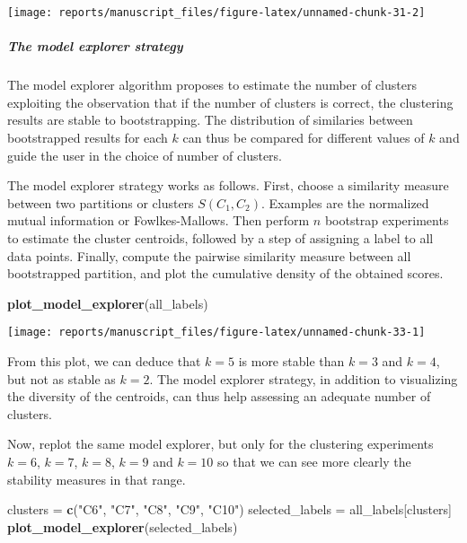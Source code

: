 \documentclass[9pt,a4paper,]{extarticle}
\newenvironment{Shaded}{\begin{snugshade}}{\end{snugshade}}
\newcommand{\KeywordTok}[1]{\textcolor[rgb]{0.13,0.29,0.53}{\textbf{#1}}}
\newcommand{\NormalTok}[1]{#1}
\newcommand{\StringTok}[1]{\textcolor[rgb]{0.31,0.60,0.02}{#1}}
\begin{document}
\begin{center}\texttt{[image: reports/manuscript\_files/figure-latex/unnamed-chunk-31-2]} \end{center}

\hypertarget{the-model-explorer-strategy}{%
\subparagraph{The model explorer strategy}\label{the-model-explorer-strategy}}

The model explorer algorithm \citep{ben-hur:stability} proposes to estimate the
number of clusters exploiting the observation that if the number of clusters
is correct, the clustering results are stable to bootstrapping. The
distribution of similaries between bootstrapped results for each \(k\) can thus
be compared for different values of \(k\) and guide the user in the choice of
number of clusters.

The model explorer strategy works as follows. First, choose a similarity
measure between two partitions or clusters \(S(C_1, C_2)\). Examples are the
normalized mutual information or Fowlkes-Mallows. Then perform \(n\) bootstrap
experiments to estimate the cluster centroids, followed by a step of assigning
a label to all data points. Finally, compute the pairwise similarity measure
between all bootstrapped partition, and plot the cumulative density of the
obtained scores.

\begin{Shaded}
\begin{Highlighting}[]
\KeywordTok{plot_model_explorer}\NormalTok{(all_labels)}
\end{Highlighting}
\end{Shaded}

\begin{center}\texttt{[image: reports/manuscript\_files/figure-latex/unnamed-chunk-33-1]} \end{center}

From this plot, we can deduce that \(k=5\) is more stable than \(k=3\) and \(k=4\),
but not as stable as \(k=2\). The model explorer strategy, in addition to
visualizing the diversity of the centroids, can thus help assessing an
adequate number of clusters.

Now, replot the same model explorer, but only for the clustering experiments
\(k=6\), \(k=7\), \(k=8\), \(k=9\) and \(k=10\) so that we can see more clearly the stability
measures in that range.

\begin{Shaded}
\begin{Highlighting}[]
\NormalTok{clusters =}\StringTok{ }\KeywordTok{c}\NormalTok{(}\StringTok{"C6"}\NormalTok{, }\StringTok{"C7"}\NormalTok{, }\StringTok{"C8"}\NormalTok{, }\StringTok{"C9"}\NormalTok{, }\StringTok{"C10"}\NormalTok{)}
\NormalTok{selected_labels =}\StringTok{ }\NormalTok{all_labels[clusters]}
\KeywordTok{plot_model_explorer}\NormalTok{(selected_labels)}
\end{Highlighting}
\end{Shaded}
\end{document}
